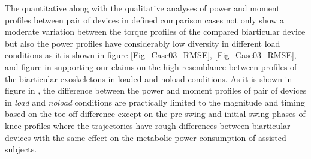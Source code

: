 \documentclass[10pt,letterpaper]{article}
\begin{document}
The quantitative along with the qualitative analyses of power and moment profiles between pair of devices in defined comparison cases not only show a moderate variation between the torque profiles of the compared biarticular device but also the power profiles have considerably low diversity in different load conditions as it is shown in figure \ref{Fig_Case03_RMSE}, \ref{Fig_Case03_RMSE}, and figure in  supporting our claims on the high resemblance between profiles of the biarticular exoskeletons in loaded and noload conditions. As it is shown in figure in , the difference between the power and moment profiles of pair of devices in {\it load} and {\it noload} conditions are practically limited to the magnitude and timing based on the toe-off difference except on the pre-swing and initial-swing phases of knee profiles where the trajectories have rough differences between biarticular devices with the same effect on the metabolic power consumption of assisted subjects.
\end{document}
